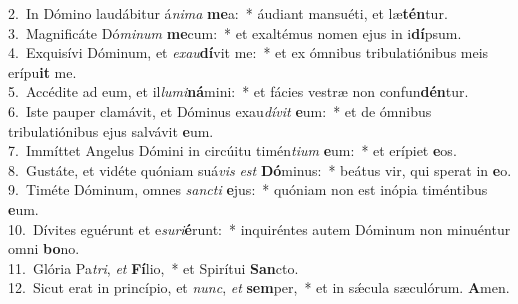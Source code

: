 {2.~}In Dómino laudábitur á\textit{ni}\textit{ma} \textbf{me}a:~* áudiant mansuéti, et læ\textbf{tén}tur.\\
{3.~}Magnificáte Dó\textit{mi}\textit{num} \textbf{me}cum:~* et exaltémus nomen ejus in i\textbf{dí}psum.\\
{4.~}Exquisívi Dóminum, et \textit{e}\textit{xau}\textbf{dí}vit me:~* et ex ómnibus tribulatiónibus meis erípu\textbf{it} me.\\
{5.~}Accédite ad eum, et il\textit{lu}\textit{mi}\textbf{ná}mini:~* et fácies vestræ non confun\textbf{dén}tur.\\
{6.~}Iste pauper clamávit, et Dóminus exau\textit{dí}\textit{vit} \textbf{e}um:~* et de ómnibus tribulatiónibus ejus salvávit \textbf{e}um.\\
{7.~}Immíttet Angelus Dómini in circúitu timén\textit{ti}\textit{um} \textbf{e}um:~* et erípiet \textbf{e}os.\\
{8.~}Gustáte, et vidéte quóniam suá\textit{vis} \textit{est} \textbf{Dó}minus:~* beátus vir, qui sperat in \textbf{e}o.\\
{9.~}Timéte Dóminum, omnes \textit{san}\textit{cti} \textbf{e}jus:~* quóniam non est inópia timéntibus \textbf{e}um.\\
{10.~}Dívites eguérunt et e\textit{su}\textit{ri}\textbf{é}runt:~* inquiréntes autem Dóminum non minuéntur omni \textbf{bo}no.\\
{11.~}Glória Pa\textit{tri}, \textit{et} \textbf{Fí}lio,~* et Spirítui \textbf{San}cto.\\
{12.~}Sicut erat in princípio, et \textit{nunc}, \textit{et} \textbf{sem}per,~* et in sǽcula sæculórum. \textbf{A}men.\\

